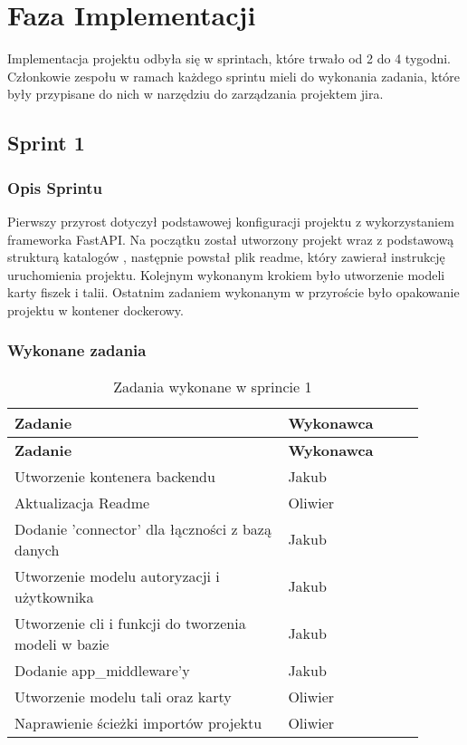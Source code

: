 \section{Faza Implementacji}
Implementacja projektu odbyła się w sprintach, które trwało od 2 do 4 tygodni. Członkowie zespołu w ramach każdego sprintu mieli do wykonania zadania, które były przypisane do nich w narzędziu do zarządzania projektem jira.

\subsection{Sprint 1}

\subsubsection{Opis Sprintu}
Pierwszy przyrost dotyczył podstawowej konfiguracji projektu z wykorzystaniem frameworka FastAPI. Na początku został utworzony projekt wraz z podstawową strukturą katalogów , następnie powstał plik readme, który zawierał instrukcję uruchomienia projektu. Kolejnym wykonanym krokiem było utworzenie modeli karty fiszek i talii. Ostatnim zadaniem wykonanym w przyroście było opakowanie projektu w kontener dockerowy.

\subsubsection{Wykonane zadania}

\begin{longtable}{|p{0.6\linewidth}|p{0.3\linewidth}|}
\hline
\textbf{Zadanie} & \textbf{Wykonawca} \\
\hline
\endfirsthead
\hline
\textbf{Zadanie} & \textbf{Wykonawca} \\
\hline
\endhead
\hline
\caption{Zadania wykonane w sprincie 1}
\endfoot
\hline
Utworzenie kontenera backendu & Jakub \\
\hline
Aktualizacja Readme & Oliwier \\
\hline
[BACKEND] Dodanie 'connector' dla łączności z bazą danych & Jakub \\
\hline
[BACKEND] Utworzenie modelu autoryzacji i użytkownika & Jakub \\
\hline
[BACKEND] Utworzenie cli i funkcji do tworzenia modeli w bazie & Jakub \\
\hline
[BACKEND] Dodanie app\_middleware'y & Jakub \\
\hline
[BACKEND] Utworzenie modelu tali oraz karty & Oliwier \\
\hline
[BACKEND] Naprawienie ścieżki importów projektu & Oliwier
\hline

\end{longtable}

